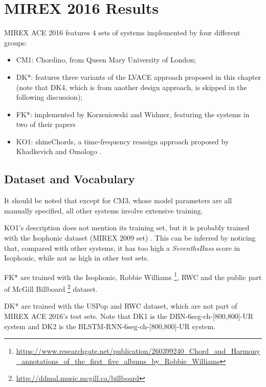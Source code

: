\section{MIREX 2016 Results}
MIREX ACE 2016 features 4 sets of systems implemented by four different groups:
\begin{itemize}
\item CM1: Chordino, from Queen Mary University of London;
\item DK*: features three variants of the LVACE approach proposed in this chapter \cite{deng2016mirex} (note that DK4, which is from another design approach, is skipped in the following discussion);
\item FK*: implemented by Korzeniowski and Widmer, featuring the systems in two of their papers \cite{Korzeniowski2016feature,Korzeniowski2016convolutional}
\item KO1: shineChords, a time-frequency reassign approach proposed by Khadkevich and Omologo \cite{khadkevich2011time}.
\end{itemize}

\subsection{Dataset and Vocabulary}
It should be noted that except for CM3, whose model parameters are all manually specified, all other systems involve extensive training.

KO1's description does not mention its training set, but it is probably trained with the Isophonic dataset (MIREX 2009 set) \cite{burgoyne2014comparative}. This can be inferred by noticing that, compared with other systems, it has too high a \textit{SeventhsBass} score in Isophonic, while not as high in other test sets.

FK* are trained with the Isophonic, Robbie Williams \footnote{\url{https://www.researchgate.net/publication/260399240\_Chord\_and\_Harmony\_annotations\_of\_the\_first\_five\_albums\_by\_Robbie\_Williams}}, RWC and the public part of McGill Billboard \footnote{\url{http://ddmal.music.mcgill.ca/billboard}} dataset.

DK* are trained with the USPop and RWC dataset, which are not part of MIREX ACE 2016's test sets. Note that DK1 is the DBN-6seg-ch-[800,800]-UR system and DK2 is the BLSTM-RNN-6seg-ch-[800,800]-UR system.

